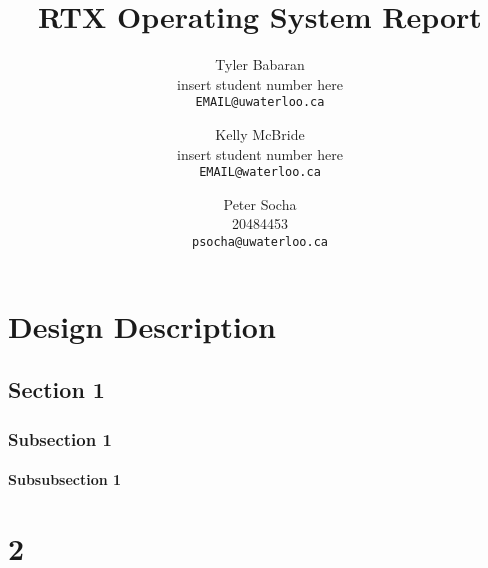\documentclass[12pt]{report}
\begin{document}
\title{RTX Operating System Report}

\author{
    Tyler Babaran\\
		insert student number here\\
    \texttt{EMAIL@uwaterloo.ca}
    \and
    Kelly McBride\\
		insert student number here\\
    \texttt{EMAIL@waterloo.ca}
    \and
    Peter Socha\\
		20484453\\
    \texttt{psocha@uwaterloo.ca}
}

\maketitle


\tableofcontents
\listofalgorithms
\listoffigures


\chapter{Design Description}

\section{Section 1}

\subsection{Subsection 1}

\subsubsection{Subsubsection 1}

\chapter{2}
\end{document}
